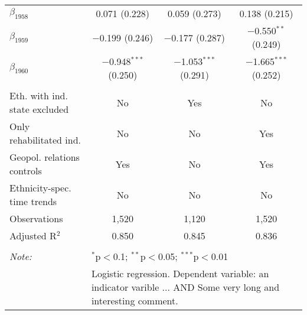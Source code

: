 \begin{table}[!h]
\begin{tabular}{@{\extracolsep{5pt}}lccc}
  $\beta_{1958}$ & 0.071 (0.228) & 0.059 (0.273) & 0.138 (0.215) \\ 
  $\beta_{1959}$ & $-$0.199 (0.246) & $-$0.177 (0.287) & $-$0.550$^{**}$ (0.249) \\ 
  $\beta_{1960}$ & $-$0.948$^{***}$ (0.250) & $-$1.053$^{***}$ (0.291) & $-$1.665$^{***}$ (0.252) \\ 
 \hline \\[-1.8ex] 
Eth. with ind. state excluded & No & Yes & No \\ 
Only rehabilitated ind. & No & No & Yes \\ 
Geopol. relations controls & Yes & No & Yes \\ 
Ethnicity-spec. time trends & No & No & No \\ 
Observations & 1,520 & 1,120 & 1,520 \\ 
Adjusted R$^{2}$ & 0.850 & 0.845 & 0.836 \\ 
\hline 
\hline \\[-1.8ex] 
\textit{Note:}  & \multicolumn{3}{l}{$^{*}$p$<$0.1; $^{**}$p$<$0.05; $^{***}$p$<$0.01} \\ 
 & \multicolumn{3}{l}{\parbox[t]{\textwidth}{Logistic regression. Dependent variable: an indicator varible ... AND Some very long and interesting comment.}} \\ 
\end{tabular} 
\end{table} 
